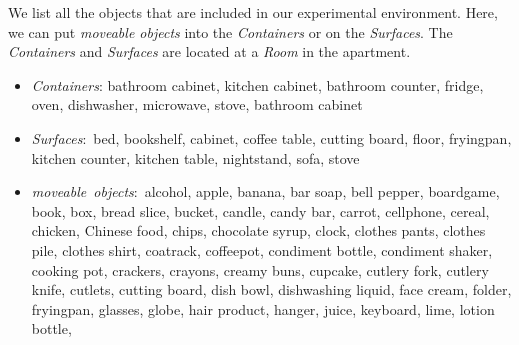 We list all the objects that are included in our experimental environment. Here, we can put \textit{moveable objects} into the \textit{Containers} or on the \textit{Surfaces}. The \textit{Containers} and \textit{Surfaces} are located at a \textit{Room} in the apartment. 
\begin{itemize}
    \item \textit{Containers}: {bathroom cabinet, kitchen cabinet, bathroom counter, fridge, oven, dishwasher, microwave, stove, bathroom cabinet}
    \item \textit{Surfaces}:~{bed,
                         bookshelf,
                         cabinet,
                         coffee table,
                         cutting board,
                         floor,
                         fryingpan,
                         kitchen counter,
                         kitchen table,
                         nightstand,
                         sofa,
                         stove}
    \item \textit{moveable~objects}:~{alcohol,
                     apple,
                     banana,
                     bar soap,
                     bell pepper,
                     boardgame,
                     book,
                     box,
                     bread slice,
                     bucket,
                     candle,
                     candy bar,
                     carrot,
                     cellphone,
                     cereal,
                     chicken,
                     Chinese food,
                     chips,
                     chocolate syrup,
                     clock,
                     clothes pants,
                     clothes pile,
                     clothes shirt,
                     coatrack,
                     coffeepot,
                     condiment bottle,
                     condiment shaker,
                     cooking pot,
                     crackers,
                     crayons,
                     creamy buns,
                     cupcake,
                     cutlery fork,
                     cutlery knife,
                     cutlets,
                     cutting board,
                     dish bowl,
                     dishwashing liquid,
                     face cream,
                     folder,
                     fryingpan,
                     glasses,
                     globe,
                     hair product,
                     hanger,
                     juice,
                     keyboard,
                     lime,
                     lotion bottle,
}
\end{itemize}
